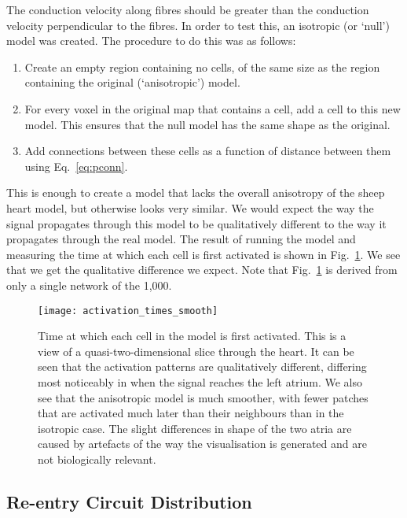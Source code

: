 The conduction velocity along fibres should be greater than the conduction velocity perpendicular to the fibres. In order to test this, an isotropic (or `null') model was created. The procedure to do this was as follows:
\begin{enumerate}
    \item Create an empty region containing no cells, of the same size as the region containing the original (`anisotropic') model.
    \item For every voxel in the original map that contains a cell, add a cell to this new model. This ensures that the null model has the same shape as the original.
    \item Add connections between these cells as a function of distance between them using Eq.~\eqref{eq:pconn}.
\end{enumerate}
This is enough to create a model that lacks the overall anisotropy of the sheep heart model, but otherwise looks very similar. We would expect the way the signal propagates through this model to be qualitatively different to the way it propagates through the real model. The result of running the model and measuring the time at which each cell is first activated is shown in Fig.~\ref{fig:activationtimes}. We see that we get the qualitative difference we expect.
Note that Fig.~\ref{fig:activationtimes} is derived from only a single network of the 1,000.

\begin{figure}[h] \begin{mdframed}
    \centering
    \texttt{[image: activation\_times\_smooth]}
    \caption{Time at which each cell in the model is first activated. This is a view of a quasi-two-dimensional slice through the heart. It can be seen that the activation patterns are qualitatively different, differing most noticeably in when the signal reaches the left atrium. We also see that the anisotropic model is much smoother, with fewer patches that are activated much later than their neighbours than in the isotropic case. The slight differences in shape of the two atria are caused by artefacts of the way the visualisation is generated and are not biologically relevant.}
    \label{fig:activationtimes}
\end{mdframed} \end{figure}

\clearpage

\subsection{Re-entry Circuit Distribution}

